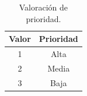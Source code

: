 \begin{table}[H]
    \centering
    \caption{Valoración de prioridad.}
    \label{tab:prioridad}
    \begin{tabular}{|c|c|}
    \hline
    \rowcolor{gray!50}
    \textbf{Valor} & \textbf{Prioridad} \\
    \hline
    1 & Alta \\
    \hline
    2 & Media \\
    \hline
    3 & Baja \\
    \hline
    \end{tabular}
\end{table}